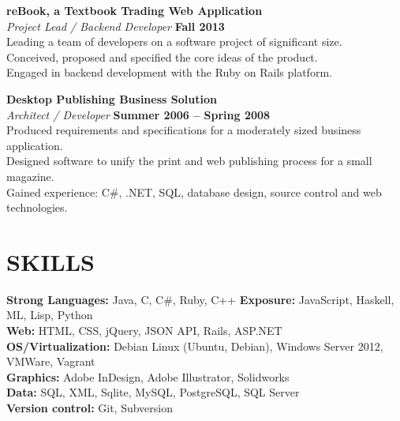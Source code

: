 \documentclass[margin,line]{resume}
\begin{document}
\begin{resume}
    \textbf{\listing reBook, a Textbook Trading Web Application} \vspace{2mm}\\\vspace{1mm}%
    \textsl{Project Lead / Backend Developer} \hfill \textbf{Fall 2013}\\
    Leading a team of developers on a software project of significant size.\\
    Conceived, proposed and specified the core ideas of the product.\\
    Engaged in backend development with the Ruby on Rails platform.

    \textbf{\listing Desktop Publishing Business Solution} \vspace{2mm}\\\vspace{1mm}%
    \textsl{Architect / Developer} \hfill \textbf{Summer 2006 -- Spring 2008}\\
    Produced requirements and specifications for a moderately sized business application.\\
    Designed software to unify the print and web publishing process for a small magazine.\\
    Gained experience: C\#, .NET, SQL, database design, source control and web technologies.
    

\sectionline

    \section{\mysidestyle \textbf{\large{S}\small{KILLS}}}

    \textbf{Strong Languages:} Java, C, C\#, Ruby, C++ \textbf{Exposure:} JavaScript, Haskell, ML, Lisp, Python\\
    \textbf{Web:} HTML, CSS, jQuery, JSON API, Rails, ASP.NET\\
    \textbf{OS/Virtualization:} Debian Linux (Ubuntu, Debian), Windows Server 2012, VMWare, Vagrant\\
    \textbf{Graphics:} Adobe InDesign, Adobe Illustrator, Solidworks\\
    \textbf{Data:} SQL, XML, Sqlite, MySQL, PostgreSQL, SQL Server\\
    \textbf{Version control:} Git, Subversion


\end{resume}
\end{document}
